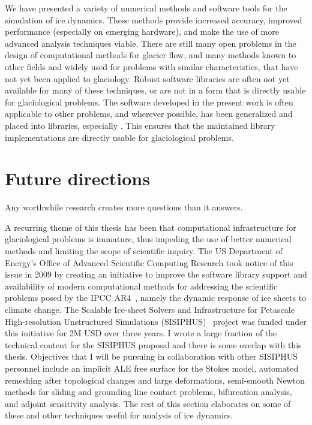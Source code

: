 We have presented a variety of numerical methods and software tools for the simulation of ice dynamics.
These methods provide increased accuracy, improved performance (especially on emerging hardware), and make the use of more advanced analysis techniques viable.
There are still many open problems in the design of computational methods for glacier flow, and many methods known to other fields and widely used for problems with similar characteristics, that have not yet been applied to glaciology.
Robust software libraries are often not yet available for many of these techniques, or are not in a form that is directly usable for glaciological problems.
The software developed in the present work is often applicable to other problems, and wherever possible, has been generalized and placed into libraries, especially {\PETSc}.
This ensures that the maintained library implementations are directly usable for glaciological problems.

\section{Future directions}
Any worthwhile research creates more questions than it answers.

A recurring theme of this thesis has been that computational infrastructure for glaciological problems is immature, thus impeding the use of better numerical methods and limiting the scope of scientific inquiry.
The US Department of Energy's Office of Advanced Scientific Computing Research took notice of this issue in 2009 by creating an initiative to improve the software library support and availability of modern computational methods for addressing the scientific problems posed by the IPCC AR4~\citep{lemk2007ar4wg1}, namely the dynamic response of ice sheets to climate change.
The Scalable Ice-sheet Solvers and Infrastructure for Petascale High-resolution Unstructured Simulations (SISIPHUS)~\citep*{sisiphus-web} project was funded under this initiative for 2M USD over three years.
I wrote a large fraction of the technical content for the SISIPHUS proposal and there is some overlap with this thesis.
Objectives that I will be pursuing in collaboration with other SISIPHUS personnel include an implicit ALE free surface for the Stokes model, automated remeshing after topological changes and large deformations, semi-smooth Newton methods for sliding and grounding line contact problems, bifurcation analysis, and adjoint sensitivity analysis.
The rest of this section elaborates on some of these and other techniques useful for analysis of ice dynamics.

